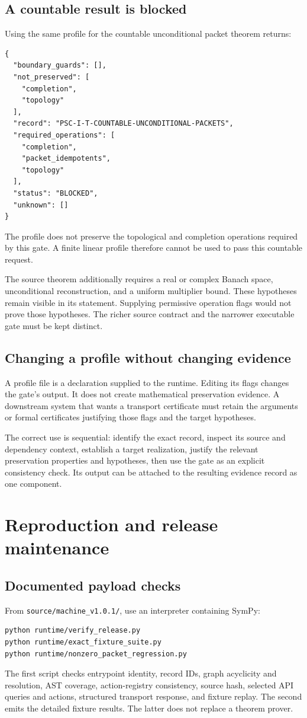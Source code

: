 \documentclass[a4paper,11pt]{article}
\begin{document}
\subsection{A countable result is blocked}
Using the same profile for the countable unconditional packet theorem returns:

\begin{lstlisting}
{
  "boundary_guards": [],
  "not_preserved": [
    "completion",
    "topology"
  ],
  "record": "PSC-I-T-COUNTABLE-UNCONDITIONAL-PACKETS",
  "required_operations": [
    "completion",
    "packet_idempotents",
    "topology"
  ],
  "status": "BLOCKED",
  "unknown": []
}
\end{lstlisting}

The profile does not preserve the topological and completion operations required by this gate. A finite linear profile therefore cannot be used to pass this countable request.

The source theorem additionally requires a real or complex Banach space, unconditional reconstruction, and a uniform multiplier bound. These hypotheses remain visible in its statement. Supplying permissive operation flags would not prove those hypotheses. The richer source contract and the narrower executable gate must be kept distinct.
\subsection{Changing a profile without changing evidence}
A profile file is a declaration supplied to the runtime. Editing its flags changes the gate's output. It does not create mathematical preservation evidence. A downstream system that wants a transport certificate must retain the arguments or formal certificates justifying those flags and the target hypotheses.

The correct use is sequential: identify the exact record, inspect its source and dependency context, establish a target realization, justify the relevant preservation properties and hypotheses, then use the gate as an explicit consistency check. Its output can be attached to the resulting evidence record as one component.

\section{Reproduction and release maintenance}
\subsection{Documented payload checks}
From \nolinkurl{source/machine_v1.0.1/}, use an interpreter containing SymPy:
\begin{lstlisting}
python runtime/verify_release.py
python runtime/exact_fixture_suite.py
python runtime/nonzero_packet_regression.py
\end{lstlisting}
The first script checks entrypoint identity, record IDs, graph acyclicity and resolution, AST coverage, action-registry consistency, source hash, selected API queries and actions, structured transport response, and fixture replay. The second emits the detailed fixture results. The latter does not replace a theorem prover.
\end{document}

